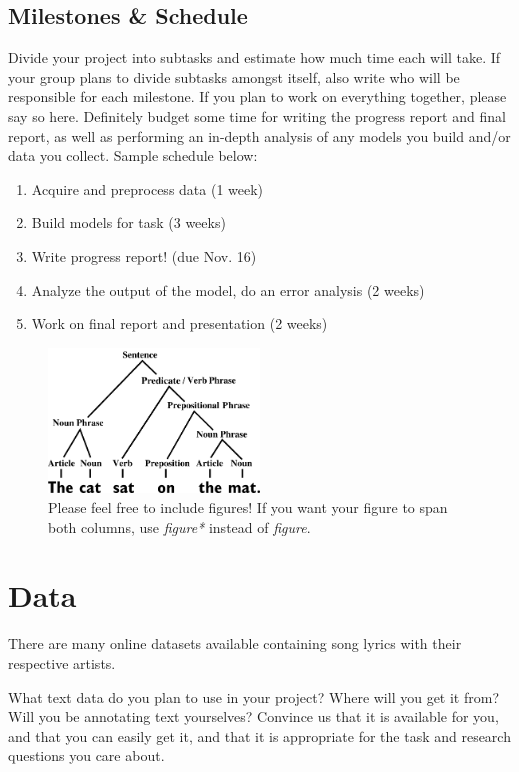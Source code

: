 \documentclass[11pt,a4paper]{article}
\begin{document}
\subsection{Milestones \& Schedule}
Divide your project into subtasks and estimate how much time each will take. If your group plans to divide subtasks amongst itself, also write who will be responsible for each milestone. If you plan to work on everything together, please say so here. Definitely budget some time for writing the progress report and final report, as well as performing an in-depth analysis of any models you build and/or data you collect. Sample schedule below:
\begin{enumerate}
    \item Acquire and preprocess data (1 week)
    \item Build models for task (3 weeks)
    \item Write progress report! (due Nov. 16)
    \item Analyze the output of the model, do an error analysis (2 weeks)
    \item Work on final report and presentation (2 weeks)
\end{enumerate}

\begin{figure}[t]
    \centering
    \includegraphics[width=0.5\textwidth]{figs/sentence.png}
    \caption{Please feel free to include figures! If you want your figure to span both columns, use \emph{figure*} instead of \emph{figure}.}
    \label{fig:example}
\end{figure}

\section{Data}
There are many online datasets available containing song lyrics with their respective artists.

What text data do you plan to use in your project? Where will you get it from? Will you be annotating text yourselves? Convince us that it is available for you, and that you can easily get it, and that it is appropriate for the task and research questions you care about.
\end{document}
